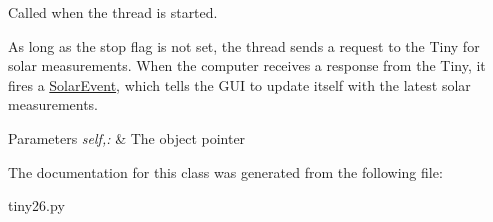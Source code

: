 Called when the thread is started. 

As long as the stop flag is not set, the thread sends a request to the Tiny for solar measurements. When the computer receives a response from the Tiny, it fires a \hyperlink{classtiny26_1_1_solar_event}{Solar\-Event}, which tells the G\-U\-I to update itself with the latest solar measurements.


\begin{DoxyParams}{Parameters}
{\em self,\-:} & The object pointer \\
\hline
\end{DoxyParams}


The documentation for this class was generated from the following file\-:\begin{DoxyCompactItemize}
\item 
tiny26.\-py\end{DoxyCompactItemize}
